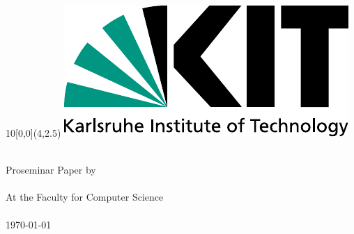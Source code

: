 
\newcommand{\diameter}{20}
\newcommand{\xone}{-15}
\newcommand{\xtwo}{160}
\newcommand{\yone}{15}
\newcommand{\ytwo}{-253}

\begin{titlepage}
	\begin{textblock}{10}[0,0](4,2.5)
		\includegraphics[width=.3\textwidth]{logos/KITLogo_RGB.pdf}
	\end{textblock}
	\vspace*{3.5cm}
	\begin{center}
		\Huge{\mytitle}
		\vspace*{2cm}\\
		\Large{
			Proseminar Paper by
		}\\
		\vspace*{1cm}
		\huge{\myname}\\
		\vspace*{1cm}
		\Large{
			At the Faculty for Computer Science
			\\
			\myinstitute
		}\\
		\vspace*{1cm}
		\Large{\today}
	\end{center}
	\vspace*{1cm}



\end{titlepage}
